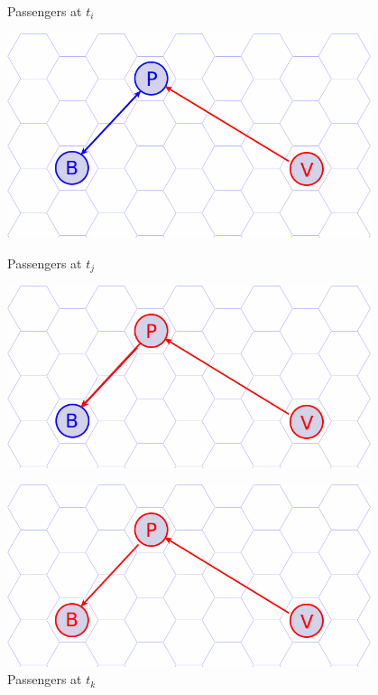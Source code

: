 \documentclass[12pt]{article}
\begin{document}
	\begin{figure}[h]
	\centering
	\begin{minipage}{0.32\textwidth}
		\centering
		\caption{Passengers at $t_i$}
		\label{Fig:tranmission-t_i}
		\includegraphics[width=0.95\textwidth]{./figures/hex-grid-trans-0.png}
	\end{minipage}
	\hfill
	\begin{minipage}{0.32\textwidth}
		\centering
		\caption{Passengers at $t_j$}
		\label{Fig:tranmission-t_j}
		\includegraphics[width=0.95\textwidth]{./figures/hex-grid-trans-1.png}
	\end{minipage}
	\hfill
	\begin{minipage}{0.32\textwidth}
		
		\centering
		\caption{Passengers at $t_k$}
		\label{Fig:tranmission-t_k}
		\includegraphics[width=0.95\textwidth]{./figures/hex-grid-trans-2.png}
	\end{minipage}
	
\end{figure}
\end{document}
